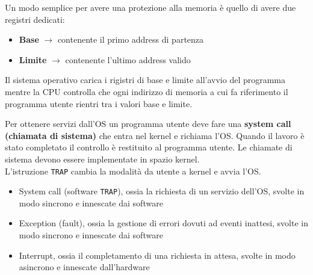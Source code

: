 \documentclass{article}
\begin{document}
Un modo semplice per avere una protezione alla memoria è quello di avere due registri dedicati:
\begin{itemize}
    \item \textbf{Base} $\rightarrow$ contenente il primo address di partenza 
    \item \textbf{Limite} $\rightarrow$ contenente l'ultimo address valido 
\end{itemize}
Il sistema operativo carica i rigistri di base e limite all'avvio del programma mentre la CPU controlla che ogni indirizzo di memoria a cui fa riferimento il programma utente rientri tra i valori base e limite.


Per ottenere servizi dall'OS un programma utente deve fare una \textbf{system call (chiamata di sistema)} che entra nel kernel e richiama l'OS. Quando il lavoro è stato completato il controllo è restituito al programma utente. Le chiamate di sistema devono essere implementate in spazio kernel.\\

L'istruzione \texttt{TRAP} cambia la modalità da utente a kernel e avvia l'OS. 
\begin{itemize}
    \item System call (software \texttt{TRAP}), ossia la richiesta di un servizio dell'OS, svolte in modo sincrono e innescate dai software
    \item Exception (fault), ossia la gestione di errori dovuti ad eventi inattesi, svolte in modo sincrono e innescate dai software
    \item Interrupt, ossia il completamento di una richiesta in attesa, svolte in modo asincrono e innescate dall'hardware
\end{itemize}
\end{document}
